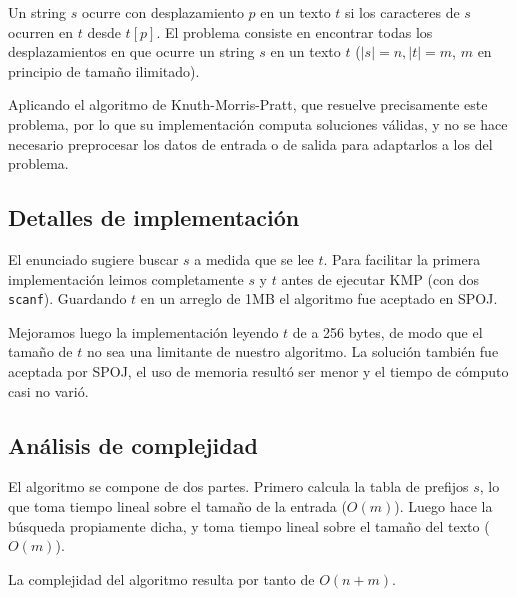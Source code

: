 Un string $s$ ocurre con desplazamiento $p$ en un texto $t$ si los caracteres
de $s$ ocurren en $t$ desde $t[p]$. El problema consiste en encontrar todas
los desplazamientos en que ocurre un string $s$ en un texto $t$ ($|s|=n,
|t|=m$, $m$ en principio de tamaño ilimitado).

Aplicando el algoritmo de Knuth-Morris-Pratt, que resuelve precisamente
este problema, por lo que su implementación computa soluciones válidas,
y no se hace necesario preprocesar los datos de entrada o de salida para
adaptarlos a los del problema.

\subsection*{Detalles de implementación}

El enunciado sugiere buscar $s$ a medida que se lee $t$. Para facilitar la
primera implementación leimos completamente $s$ y $t$ antes de ejecutar KMP
(con dos {\tt scanf}). Guardando $t$ en un arreglo de 1MB el algoritmo fue
aceptado en SPOJ.

Mejoramos luego la implementación leyendo $t$ de a 256 bytes, de modo que
el tamaño de $t$ no sea una limitante de nuestro algoritmo. La solución
también fue aceptada por SPOJ, el uso de memoria resultó ser menor y el
tiempo de cómputo casi no varió.

\subsection*{Análisis de complejidad}

El algoritmo se compone de dos partes. Primero calcula la tabla de prefijos $s$,
lo que toma tiempo lineal sobre el tamaño de la entrada ($O(m)$). Luego hace la
búsqueda propiamente dicha, y toma tiempo lineal sobre el tamaño del texto ($O(m)$).

La complejidad del algoritmo resulta por tanto de $O(n+m)$.

